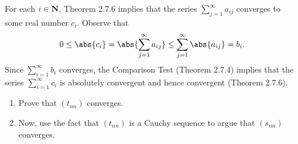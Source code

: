 \documentclass{lew98_solutions}
\begin{document}
\begin{solution}
    For each \( i \in \mathbf{N} \), Theorem 2.7.6 implies that the series \( \sum_{j=1}^{\infty} a_{ij} \) converges to some real number \( c_i \). Observe that
    \[
        0 \leq \abs{c_i} = \abs{\sum_{j=1}^{\infty} a_{ij}} \leq \sum_{j=1}^{\infty} \abs{a_{ij}} = b_i.
    \]
    Since \( \sum_{i=1}^{\infty} b_i \) converges, the Comparison Test (Theorem 2.7.4) implies that the series \( \sum_{i=1}^{\infty} c_i \) is absolutely convergent and hence convergent (Theorem 2.7.6).
\end{solution}

\begin{exercise}
\label{ex:2.8.3}
        \begin{enumerate}
        \item Prove that \( (t_{nn}) \) converges.

        \item Now, use the fact that \( (t_{nn}) \) is a Cauchy sequence to argue that \( (s_{nn}) \) converges.
    \end{enumerate}
\end{exercise}
\end{document}

